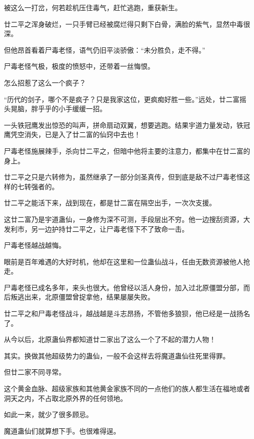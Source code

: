 
\begin{this_body}



被这么一打岔，何若趁机压住毒气，赶忙逃跑，重获新生。

廿二平之浑身破烂，一只手臂已经被腐烂得只剩下白骨，满脸的紫气，显然中毒很深。

但他昂首看着尸毒老怪，语气仍旧平淡骄傲：“未分胜负，走不得。”

尸毒老怪气极，极度的愤怒中，还带着一丝悔恨。

怎么招惹了这么一个疯子？

“历代的剑子，哪个不是疯子？只是我家这位，更疯痴好胜一些。”远处，廿二富摇头晃脑，胖乎乎的小手缓缓一招。

一头铁冠鹰发出惊恐的叫声，拼命扇动双翼，想要逃跑。结果宇道力量发动，铁冠鹰凭空消失，已是入了廿二富的仙窍中去也！

尸毒老怪施展辣手，杀向廿二平之，但暗中他将主要的注意力，都集中在廿二富的身上。

廿二平之只是六转修为，虽然继承了一部分剑圣真传，但到底是敌不过尸毒老怪这样的七转强者的。

廿二平之能活下来，战到现在，都是廿二富在隔空出手，一次次支援。

这廿二富乃是宇道蛊仙，一身修为深不可测，手段层出不穷。他一边搜刮资源，大发利市，另一边护持廿二平之，让尸毒老怪下不了致命一击。

尸毒老怪越战越悔。

眼前是百年难遇的大好时机，他却在这里和一位蛊仙战斗，任由无数资源被他人抢走。

尸毒老怪已成名多年，来头也很大。他曾经以活人身份，加入过北原僵盟分部，而后叛逃出来，北原僵盟曾捉拿他，结果屡屡失败。

廿二平之和尸毒老怪战斗，越战越是斗志昂扬，不管他多狼狈，他已经是一战扬名了。

从今以后，北原蛊仙界都知道廿二家出了这么一个了不起的潜力人物！

其实。换做其他超级势力的蛊仙，一般不会这样去将魔道蛊仙往死里得罪。

但廿二家不同寻常。

这个黄金血脉、超级家族和其他黄金家族不同的一点他们的族人都生活在福地或者洞天之内，不占取北原外界的任何领地。

如此一来，就少了很多顾忌。

魔道蛊仙们就算想下手。也很难得逞。


\end{this_body}
